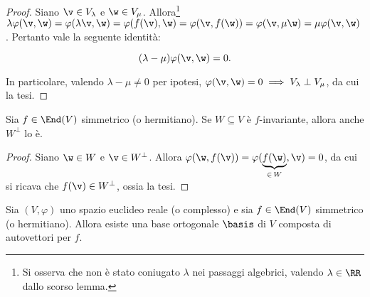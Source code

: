 \documentclass[11pt]{article}
\begin{document}
	\begin{proof}
		Siano $\v \in V_\lambda$ e $\w \in V_\mu$. Allora\footnote{Si osserva che non è stato coniugato $\lambda$
		nei passaggi algebrici, valendo $\lambda \in \RR$ dallo scorso lemma.} $\lambda \varphi(\v, \w) = \varphi(\lambda \v, \w) = \varphi(f(\v), \w) = \varphi(\v, f(\w)) = \varphi(\v, \mu \w) = \mu \varphi(\v, \w)$.
		Pertanto vale la seguente identità:
		
		\[ (\lambda - \mu) \varphi(\v, \w) = 0. \]
		
		\vskip 0.05in
		
		In particolare, valendo $\lambda - \mu \neq 0$ per ipotesi, $\varphi(\v, \w) = 0 \implies V_\lambda \perp V_\mu$,
		da cui la tesi.
	\end{proof}
	
	\begin{lemma}
		Sia $f \in \End(V)$ simmetrico (o hermitiano). Se $W \subseteq V$ è $f$-invariante, allora anche
		$W^\perp$ lo è.
	\end{lemma}
	
	\begin{proof}
		Siano $\w \in W$ e $\v \in W^\perp$. Allora $\varphi(\w, f(\v)) = \varphi(\underbrace{f(\w)}_{\in \, W}, \v) = 0$, da cui si ricava che $f(\v) \in W^\perp$, ossia la tesi.
	\end{proof}
	
	\begin{theorem} 
		Sia $(V, \varphi)$ uno spazio euclideo reale (o complesso) e sia $f \in \End(V)$ simmetrico (o hermitiano). Allora esiste una base ortogonale $\basis$ di $V$ composta di autovettori per $f$.
	\end{theorem}
	
\end{document}
